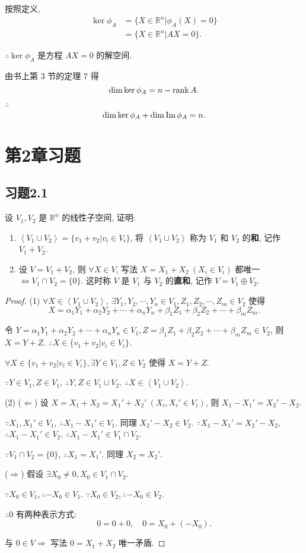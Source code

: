 \documentclass{ctexart}
\begin{document}
按照定义,
\begin{align*}
    \ker\phi_A & =\{X\in\mathbb{R}^n|\phi_A(X)=0\} \\
    & =\{X\in\mathbb{R}^n|AX=0\}.
\end{align*}

$\therefore\ker\phi_A$ 是方程 $AX=0$ 的解空间.

由书上第 3 节的定理 7 得
\[\dim\ker\phi_A=n-\operatorname{rank} A.\]

$\therefore$
\[\dim\ker\phi_A+\dim\operatorname{Im} \phi_A=n.\]
\section{第2章习题}
\subsection{习题2.1}
\begin{exercise}[有改动]\label{ex1.1}
    设 $V_1,V_2$ 是 $\mathbb{R}^n$ 的线性子空间, 证明:
    \begin{enumerate}
        \def\labelenumi{(\arabic{enumi})}
        \item $\left<V_1\cup V_2\right>=\{v_1+v_2|v_i\in V_i\}$, 将 $\left<V_1\cup V_2\right>$ 称为 $V_1$ 和 $V_2$ 的\textbf{和}, 记作 $V_1+V_2$.
        \item 设 $V=V_1+V_2$, 则 $\forall X\in V$, 写法 $X=X_1+X_2\ (X_i\in V_i)$ 都唯一 $\Leftrightarrow V_1\cap V_2=\{0\}$. 这时称 $V$ 是 $V_1$ 与 $V_2$ 的\textbf{直和}, 记作 $V=V_1\oplus V_2$.
    \end{enumerate}
\end{exercise}
\begin{proof}
    (1) $\forall X\in\left<V_1\cup V_2\right>$, $\exists Y_1,Y_2,\cdots,Y_n\in V_1,Z_1,Z_2,\cdots,Z_m\in V_2$ 使得
    \[X=\alpha_1Y_1+\alpha_2Y_2+\cdots+\alpha_nY_n+\beta_1Z_1+\beta_2Z_2+\cdots+\beta_mZ_m.\]

    令 $Y=\alpha_1Y_1+\alpha_2Y_2+\cdots+\alpha_nY_n\in V_1,Z=\beta_1Z_1+\beta_2Z_2+\cdots+\beta_mZ_m\in V_2$, 则 $X=Y+Z$. $\therefore X\in\{v_1+v_2|v_i\in V_i\}$.

    $\forall X\in\{v_1+v_2|v_i\in V_i\},\exists Y\in V_1,Z\in V_2$ 使得 $X=Y+Z$.

    $\because Y\in V_1,Z\in V_1$, $\therefore Y,Z\in V_1\cup V_2$. $\therefore X\in\left<V_1\cup V_2\right>$.
    
    (2) ($\Leftarrow$) 设 $X=X_1+X_2=X_1'+X_2'\ (X_i,X_i'\in V_i)$, 则 $X_1-X_1'=X_2'-X_2$.

    $\because X_1,X_1'\in V_1$, $\therefore X_1-X_1'\in V_1$. 同理 $X_2'-X_2\in V_2$. $\because X_1-X_1'=X_2'-X_2$, $\therefore X_1-X_1'\in V_2$. $\therefore X_1-X_1'\in V_1\cap V_2$.

    $\because V_1\cap V_2=\{0\}$, $\therefore X_1=X_1'$. 同理 $X_2=X_2'$.

    ($\Rightarrow$) 假设 $\exists X_0\neq0,X_0\in V_1\cap V_2$.

    $\because X_0\in V_1,\therefore-X_0\in V_1$. $\because X_0\in V_2,\therefore-X_0\in V_2$.

    $\therefore0$ 有两种表示方式:
    \[0=0+0,\quad0=X_0+(-X_0).\]

    与 $0\in V\Rightarrow$ 写法 $0=X_1+X_2$ 唯一矛盾.
\end{proof}
\end{document}
